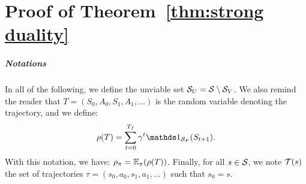 \chapter{Proof of Theorem~\ref{thm:strong duality}} \label{chap:proof strong duality}
\paragraph{Notations} In all of the following, we define the unviable set $\SU = \S\setminus\SV$. We also remind the reader that $T = (S_0, A_0, S_1, A_1, \hdots)$ is the random variable denoting the trajectory, and we define:
$$
	\rho(T) = \sum_{t=0}^\Tf\gamma^t\indicator_{\SF}(S_{t+1}).
$$
With this notation, we have: $\rho_\pi = \expected_\pi(\rho(T))$. Finally, for all $s\in\S$, we note $\T(s)$ the set of trajectories $\tau = (s_0, a_0, s_1, a_1, \hdots)$ such that $s_0 = s$.

